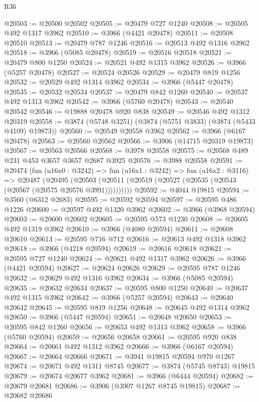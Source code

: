 \begin{lexlean}{R36}
\begin{coremodule}
@20503 := @20500 @20502
@20505 := @20479 @727 @1240
@20508 := @20505 @492 @1317 @3962
@20510 := @3966 (@4421 @20478)
@20511 := @20508 @20510
@20513 := @20479 @787 @1246
@20516 := @20513 @492 @1316 @3962
@20518 := @3966 (@5085 @20478)
@20519 := @20516 @20518
@20521 := @20479 @800 @1250
@20524 := @20521 @492 @1315 @3962
@20526 := @3966 (@5257 @20478)
@20527 := @20524 @20526
@20529 := @20479 @819 @1256
@20532 := @20529 @492 @1314 @3962
@20534 := @3966 (@5447 @20478)
@20535 := @20532 @20534
@20537 := @20479 @842 @1260
@20540 := @20537 @492 @1313 @3962
@20542 := @3966 (@5760 @20478)
@20543 := @20540 @20542
@20546 := @19888 @20478 @920 @838
@20549 := @20546 @492 @1312 @20319
@20558 := @3874 (@5748 @3251) (@3874 (@5751 @3833) (@3874 (@5433 @4109) @19873))
@20560 := @20549 @20558 @3962
@20562 := @3966 (@6167 @20478)
@20563 := @20560 @20562
@20566 := @3906 (@14715 @20319 @19873)
@20567 := @20563 @20566
@20568 := @3978 @20558
@20575 := @20568 @489 @231 @453 @3657 @3657 @2687 @3925
@20576 := @3988 @20558
@20591 := @20474
    (fun (u16x0 : @3242) =>
    fun (u16x1 : @3242) =>
    fun (u16x2 : @3116) =>
    @20487
      (@20495 (@20503 (@20511 (@20519 (@20527 (@20535 (@20543 (@20567 (@20575 @20576 @3991))))))))))
@20592 := @4044 @19815
@20594 := @3560 (@6312 @2683)
@20595 := @20592 @20594
@20597 := @20595 @486 @1226
@20600 := @20597 @492 @1320 @3962
@20602 := @3966 (@3968 @20594)
@20603 := @20600 @20602
@20605 := @20595 @573 @1230
@20608 := @20605 @492 @1319 @3962
@20610 := @3966 (@4080 @20594)
@20611 := @20608 @20610
@20613 := @20595 @716 @712
@20616 := @20613 @492 @1318 @3962
@20618 := @3966 (@4218 @20594)
@20619 := @20616 @20618
@20621 := @20595 @727 @1240
@20624 := @20621 @492 @1317 @3962
@20626 := @3966 (@4421 @20594)
@20627 := @20624 @20626
@20629 := @20595 @787 @1246
@20632 := @20629 @492 @1316 @3962
@20634 := @3966 (@5085 @20594)
@20635 := @20632 @20634
@20637 := @20595 @800 @1250
@20640 := @20637 @492 @1315 @3962
@20642 := @3966 (@5257 @20594)
@20643 := @20640 @20642
@20645 := @20595 @819 @1256
@20648 := @20645 @492 @1314 @3962
@20650 := @3966 (@5447 @20594)
@20651 := @20648 @20650
@20653 := @20595 @842 @1260
@20656 := @20653 @492 @1313 @3962
@20658 := @3966 (@5760 @20594)
@20659 := @20656 @20658
@20661 := @20595 @920 @838
@20664 := @20661 @492 @1312 @3962
@20666 := @3966 (@6167 @20594)
@20667 := @20664 @20666
@20671 := @3941 @19815 @20594 @970 @1267
@20674 := @20671 @492 @1311 @8745
@20677 := @3874 (@5745 @8743) @19815
@20679 := @20674 @20677 @3962
@20681 := @3966 (@6444 @20594)
@20682 := @20679 @20681
@20686 := @3906 (@3907 @1267 @8745 @19815)
@20687 := @20682 @20686

\end{coremodule}
\end{lexlean}
